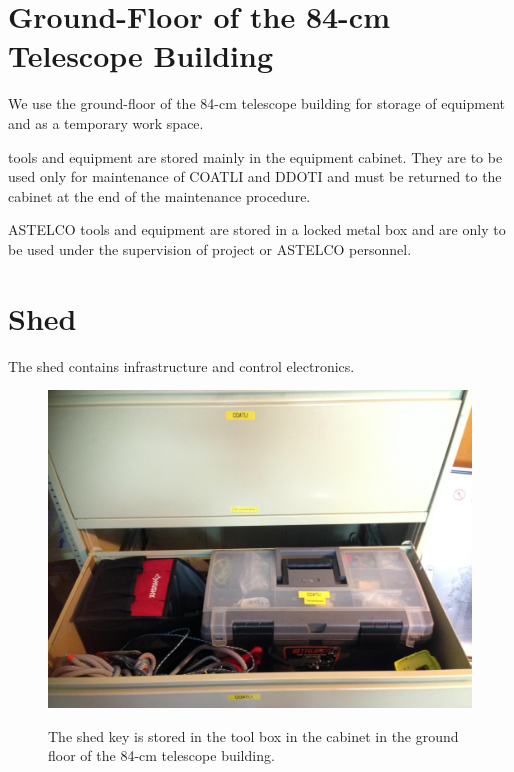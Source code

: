 \fi

\section{Ground-Floor of the 84-cm Telescope Building}

We use the ground-floor of the 84-cm telescope building for storage of equipment and as a temporary work space.

{\projectname} tools and equipment are stored mainly in the equipment cabinet. They are to be used only for maintenance of COATLI and DDOTI and must be returned to the cabinet at the end of the maintenance procedure.

ASTELCO tools and equipment are stored in a locked metal box and are only to be used under the supervision of project or ASTELCO personnel.

\section{Shed}
\label{section:shed}
\label{section:shed-key}

The shed contains infrastructure and control electronics.

\begin{figure}
\begin{center}
\begin{labeled}{\includegraphics[width=0.8\linewidth]{figures/buildings-shed-key.jpg}}
\end{labeled}
\end{center}
\caption{The shed key is stored in the tool box in the cabinet in the ground floor of the 84-cm telescope building.}
\label{figure:buildings-shed-key}
\end{figure}

